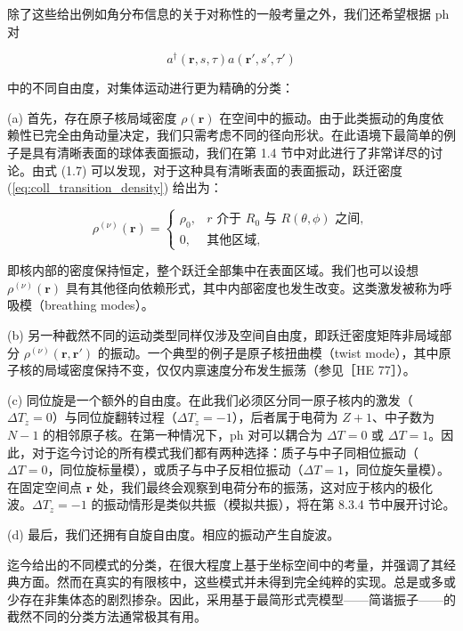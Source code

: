 除了这些给出例如角分布信息的关于对称性的一般考量之外，我们还希望根据 ph 对

\begin{equation}
a^{\dagger}(\boldsymbol{r},s,\tau)a(\boldsymbol{r}',s',\tau')\label{eq:coll_general_ph_density}
\end{equation}

中的不同自由度，对集体运动进行更为精确的分类：

(a) 首先，存在原子核局域密度 $\rho(\boldsymbol{r})$ 在空间中的振动。由于此类振动的角度依赖性已完全由角动量决定，我们只需考虑不同的径向形状。在此语境下最简单的例子是具有清晰表面的球体表面振动，我们在第
1.4 节中对此进行了非常详尽的讨论。由式 (1.7) 可以发现，对于这种具有清晰表面的表面振动，跃迁密度 (\ref{eq:coll_transition_density})
给出为：

\begin{equation}
\rho^{(\nu)}(\boldsymbol{r})=\begin{cases}
\rho_{0}, & r\text{ 介于 }R_{0}\text{ 与 }R(\theta,\phi)\text{ 之间},\\
0, & \text{其他区域},
\end{cases}\label{eq:coll_sharp_surface_transition_density}
\end{equation}

即核内部的密度保持恒定，整个跃迁全部集中在表面区域。我们也可以设想 $\rho^{(\nu)}(\boldsymbol{r})$
具有其他径向依赖形式，其中内部密度也发生改变。这类激发被称为呼吸模（breathing modes）。

(b) 另一种截然不同的运动类型同样仅涉及空间自由度，即跃迁密度矩阵非局域部分 $\rho^{(\nu)}(\boldsymbol{r},\boldsymbol{r}')$
的振动。一个典型的例子是原子核扭曲模（twist mode），其中原子核的局域密度保持不变，仅仅内禀速度分布发生振荡（参见［HE 77］）。

(c) 同位旋是一个额外的自由度。在此我们必须区分同一原子核内的激发（$\Delta T_{z}=0$）与同位旋翻转过程（$\Delta T_{z}=-1$），后者属于电荷为
$Z+1$、中子数为 $N-1$ 的相邻原子核。在第一种情况下，ph 对可以耦合为 $\Delta T=0$ 或 $\Delta T=1$。因此，对于迄今讨论的所有模式我们都有两种选择：质子与中子同相位振动（$\Delta T=0$，同位旋标量模），或质子与中子反相位振动（$\Delta T=1$，同位旋矢量模）。在固定空间点
$\boldsymbol{r}$ 处，我们最终会观察到电荷分布的振荡，这对应于核内的极化波。$\Delta T_{z}=-1$
的振动情形是类似共振（模拟共振），将在第 8.3.4 节中展开讨论。

(d) 最后，我们还拥有自旋自由度。相应的振动产生自旋波。

迄今给出的不同模式的分类，在很大程度上基于坐标空间中的考量，并强调了其经典方面。然而在真实的有限核中，这些模式并未得到完全纯粹的实现。总是或多或少存在非集体态的剧烈掺杂。因此，采用基于最简形式壳模型——简谐振子——的截然不同的分类方法通常极其有用。


